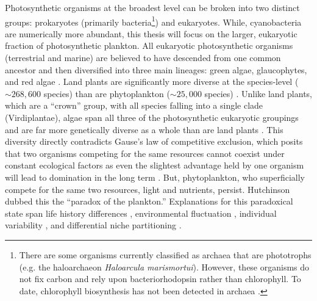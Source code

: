 Photosynthetic organisms at the broadest level can be broken into two distinct groups: prokaryotes (primarily bacteria\footnote{There are some organisms currently classified as archaea that are phototrophs (e.g. the haloarchaeon \textit{Haloarcula marismortui}). However, these organisms do not fix carbon and rely upon bacteriorhodopsin rather than chlorophyll. To date, chlorophyll biosynthesis has not been detected in archaea \citep{Bryant2006}.}) and eukaryotes. While, cyanobacteria are numerically more abundant, this thesis will focus on the larger, eukaryotic fraction of photosynthetic plankton. All eukaryotic photosynthetic organisms (terrestrial and marine) are believed to have descended from one common ancestor \citep{Margulis1971} and then diversified into three main lineages: green algae, glaucophytes, and red algae \citep{Falkowski2004}. Land plants are significantly more diverse at the species-level ($\sim268,600$ species) \citep{Chapman2009} than are phytoplankton ($\sim25,000$ species) \citep{Costello2013}. Unlike land plants, which are a ``crown'' group, with all species falling into a single clade (Virdiplantae), algae span all three of the photosynthetic eukaryotic groupings and are far more genetically diverse as a whole than are land plants \citep{Falkowski2004}. This diversity directly contradicts Gause’s law of competitive exclusion, which posits that two organisms competing for the same resources cannot coexist under constant ecological factors as even the slightest advantage held by one organism will lead to domination in the long term \citep{Hardin1960}. But, phytoplankton, who superficially compete for the same two resources, light and nutrients, persist. Hutchinson \citeyearpar{Hutchinson1961} dubbed this the ``paradox of the plankton.'' Explanations for this paradoxical state span life history differences \citep{Huisman2001}, environmental fluctuation \citep{Roy2007}, individual variability \citep{Menden-deuer2014}, and differential niche partitioning \citep{Connel1980}. \par


